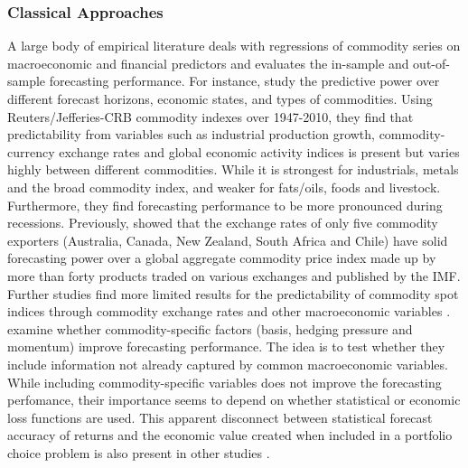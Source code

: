 \subsubsection{Classical Approaches}    \label{subsubsec: literature_classical approaches}
A large body of empirical literature deals with regressions of commodity series on macroeconomic and financial predictors and evaluates the in-sample and out-of-sample forecasting performance. For instance, \textcite{garganoForecastingCommodityPrice2014} study the predictive power over different forecast horizons, economic states, and types of commodities. Using Reuters/Jefferies-CRB commodity indexes over 1947-2010, they find that predictability from variables such as industrial production growth, commodity-currency exchange rates and global economic activity indices is present but varies highly between different commodities. While it is strongest for industrials, metals and the broad commodity index, and weaker for fats/oils, foods and livestock. Furthermore, they find forecasting performance to be more pronounced during recessions. Previously, \textcite{chenCanExchangeRates2010} showed that the exchange rates of only five commodity exporters (Australia, Canada, New Zealand, South Africa and Chile) have solid forecasting power over a global aggregate commodity price index made up by more than forty products traded on various exchanges and published by the IMF. Further studies find more limited results for the predictability of commodity spot indices through commodity exchange rates and other macroeconomic variables \parencite{groenCommodityPricesCommodity2011}. \textcite{guidolin_forecasting_2021} examine whether commodity-specific factors (basis, hedging pressure and momentum) improve forecasting performance. The idea is to test whether they include information not already captured by common macroeconomic variables. While including commodity-specific variables does not improve the forecasting perfomance, their importance seems to depend on whether statistical or economic loss functions are used. This apparent disconnect between statistical forecast accuracy of returns and the economic value created when included in a portfolio choice problem is also present in other studies \parencite{cenesizogluReturnPredictionModels2012, guidolinPredictingCommodityReturns2026}. 

